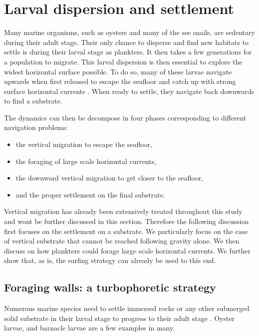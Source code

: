 \chapter{Larval dispersion and settlement}\label{app:horizontal_dispersion}

Many marine organisms, such as oysters and many of the see snails, are sedentary during their adult stage.
Their only chance to disperse and find new habitats to settle is during their larval stage as plankters.
It then takes a few generations for a population to migrate.
This larval dispersion is then essential to explore the widest horizontal surface possible.
To do so, many of these larvae navigate upwards when first released to escape the seafloor and catch up with strong surface horizontal currents \citep{mcedward2020ecology, welch2001flood, kingsford2002sensory}.
When ready to settle, they navigate back downwards to find a substrate.

The dynamics can then be decompose in four phases corresponding to different navigation problems:
\begin{itemize}
	\item the vertical migration to escape the seafloor,
	\item the foraging of large scale horizontal currents,
	\item the downward vertical migration to get closer to the seafloor,
	\item and the proper settlement on the final substrate.
\end{itemize}
Vertical migration has already been extensively treated throughout this study and wont be further discussed in this section.
Therefore the following discussion first focuses on the settlement on a substrate.
We particularly focus on the case of vertical substrate that cannot be reached following gravity alone.
We then discuss on how plankters could forage large scale horizontal currents.
We further show that, as is, the surfing strategy can already be used to this end.

\section{Foraging walls: a turbophoretic strategy}

Numerous marine species need to settle immersed rocks or any other submerged solid substrate in their larval stage to progress to their adult stage \citep{eckman1998larval, crimaldi2002hydrodynamics, fuchs2007effects}.
Oyster larvae, \citep{fuchs2013active, fuchs2015hydrodynamic} and barnacle larvae \citep{larsson2016instantaneous} are a few examples in many.

